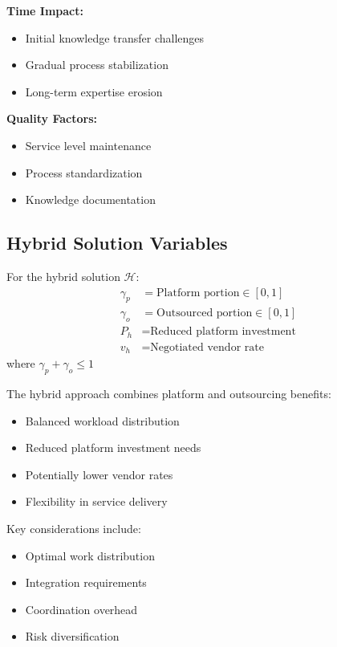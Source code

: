 \documentclass[12pt,a4paper]{article}
\newenvironment{definition}[1]
{\begin{mdframed}[style=definitionstyle,frametitle={Definition: #1}]}
{\end{mdframed}}
\newenvironment{explanation}
{\begin{mdframed}[style=explanationstyle,frametitle={Explanation}]}
{\end{mdframed}}
\newenvironment{observation}
{\begin{mdframed}[style=observationstyle,frametitle={Observation}]}
{\end{mdframed}}
\begin{document}
\begin{observation}
\textbf{Time Impact:}
\begin{itemize}
    \item Initial knowledge transfer challenges
    \item Gradual process stabilization
    \item Long-term expertise erosion
\end{itemize}
\textbf{Quality Factors:}
\begin{itemize}
    \item Service level maintenance
    \item Process standardization
    \item Knowledge documentation
\end{itemize}
\end{observation}

\subsection{Hybrid Solution Variables}
\begin{definition}{Hybrid Variables}
For the hybrid solution $\mathcal{H}$:
\begin{align*}
    \gamma_p &= \text{Platform portion} \in [0,1] \\
    \gamma_o &= \text{Outsourced portion} \in [0,1] \\
    P_h &= \text{Reduced platform investment} \\
    v_h &= \text{Negotiated vendor rate}
\end{align*}
where $\gamma_p + \gamma_o \leq 1$
\end{definition}

\begin{explanation}
The hybrid approach combines platform and outsourcing benefits:
\begin{itemize}
    \item Balanced workload distribution
    \item Reduced platform investment needs
    \item Potentially lower vendor rates
    \item Flexibility in service delivery
\end{itemize}

Key considerations include:
\begin{itemize}
    \item Optimal work distribution
    \item Integration requirements
    \item Coordination overhead
    \item Risk diversification
\end{itemize}
\end{explanation}
\end{document}
